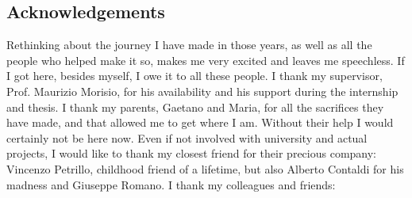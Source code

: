 \newpage
\pagestyle{empty}
\begin{spacing}{\myspacing}
\section*{Acknowledgements}

Rethinking about the journey I have made in those years, as well as all the people who helped make it so, makes me very excited and leaves me speechless. If I got here, besides myself, I owe it to all these people.
\newline\newline \noindent I thank my supervisor, Prof. Maurizio Morisio, for his availability and his support during the internship and thesis.
\newline\newline \noindent I thank my parents, Gaetano and Maria, for all the sacrifices they have made, and that allowed me to get where I am. Without their help I would certainly not be here now.
\newline\newline \noindent Even if not involved with university and actual projects, I would like to thank my closest friend for their precious company: Vincenzo Petrillo, childhood friend of a lifetime, but also Alberto Contaldi for his madness and Giuseppe Romano.
\newline\newline \noindent I thank my colleagues and friends: 


\end{spacing}
